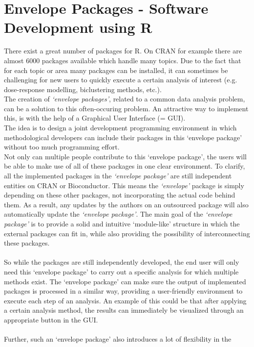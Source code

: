 \documentclass[a4paper]{article}\usepackage[]{graphicx}\usepackage[]{color}
\begin{document}
\section{Envelope Packages - Software Development using R}
\noindent There exist a great number of packages for R. On CRAN for example
there are almost 6000 packages available which handle many topics. 
Due to the fact that for each topic or area many packages can be installed, it
can sometimes be challenging for new users to quickly execute a certain
analysis of interest (e.g. dose-response modelling, biclustering
methods, etc.).\\
The creation of {\it `envelope packages'}, related to a common data analysis
problem, can be a solution to this often-occuring problem. 
An attractive way to implement this, is with the help of a Graphical User
Interface (= GUI).\\
The idea is to design a joint development programming environment in which
methodological developers can include their packages in this `envelope
package' without too much programming effort.\\
Not only can multiple people contribute to this `envelope package', the users
will be able to make use of all of these packages in one clear environment. 
To clarify, all the implemented packages in the {\it `envelope
package'} are still independent entities on CRAN or Bioconductor. This means the
{\it `envelope'} package is simply depending on these other packages, not
incorporating the actual code behind them. As a result, any updates by the
authors on an outsourced package will also automatically update the {\it
`envelope package'}. The main goal of the {\it `envelope package'} is to provide
a solid and intuitive `module-like' structure in which the external packages can
fit in, while also providing the possibility of interconnecting these packages.
\\ \\
So while the packages are still independently developed, the end user will only
need this `envelope package' to carry out a specific analysis for which multiple
methods exist. The `envelope package' can make sure the output of implemented
packages is processed in a similar way, providing a user-friendly environment to
execute each step of an analysis. An example of this could be that after
applying a certain analysis method, the results can immediately be visualized
through an appropriate button in the GUI. \\ \\
Further, such an `envelope package' also introduces a lot of flexibility in the
\end{document}
